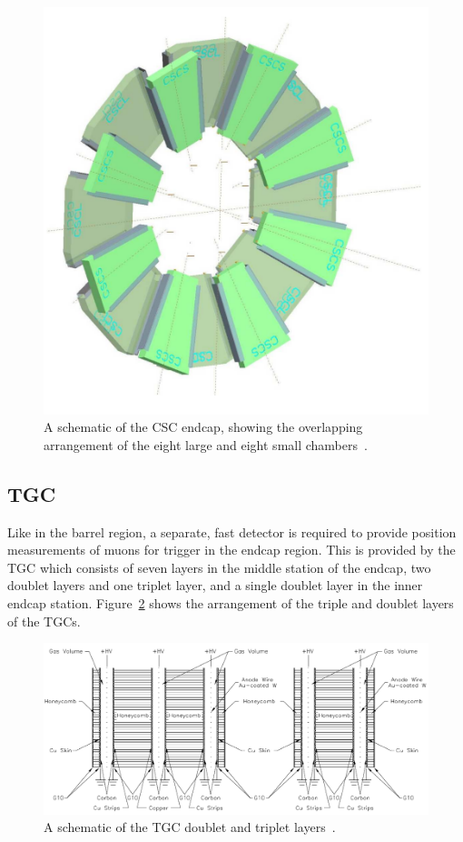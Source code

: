 \begin{figure}[hbtp]
\includegraphics[width=\fullfig]{figures/csc_schematic.png}
\caption{A schematic of the \acs*{CSC} endcap, showing the overlapping arrangement of the eight large and eight small chambers~\cite{atlas_experiment}.}
\label{fig:csc_schematic}
\end{figure}

\subsection{\acl{TGC}}
Like in the barrel region, a separate, fast detector is required to provide position measurements of muons for trigger in the endcap region.
This is provided by the \ac{TGC} which consists of seven layers in the middle station of the endcap, two doublet layers and one triplet layer, and a single doublet layer in the inner endcap station.
Figure~\ref{fig:tgc_schematic} shows the arrangement of the triple and doublet layers of the \acp{TGC}.

\begin{figure}[hbtp]
\includegraphics[width=\fullfig]{figures/tgc_schematic.pdf}
\caption{A schematic of the \acs*{TGC} doublet and triplet layers~\cite{atlas_experiment}.}
\label{fig:tgc_schematic}
\end{figure}

